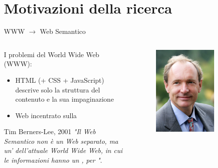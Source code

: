 \section{Motivazioni della ricerca}

\begin{frame}{WWW $\to$ Web Semantico}
	\begin{columns}
		\begin{column}{0.7\textwidth}
			I problemi del World Wide Web (WWW):
			\begin{itemize}
				\item HTML (+ CSS + JavaScript) descrive solo la struttura del contenuto e la sua impaginazione
				\item Web incentrato sulla 
			\end{itemize}
			\begin{block}{Tim Berners-Lee, 2001}
				\textsl{"Il Web Semantico non è un Web separato, ma un' dell'attuale World Wide Web, in cui le informazioni hanno un , per "}.
			\end{block}			
		\end{column}
	\begin{column}{0.3\textwidth}
		\begin{figure}
			\includegraphics[width=0.8\textwidth]{pictures/berners-lee.png}
		\end{figure}
	\end{column}
	\end{columns}
\end{frame}

